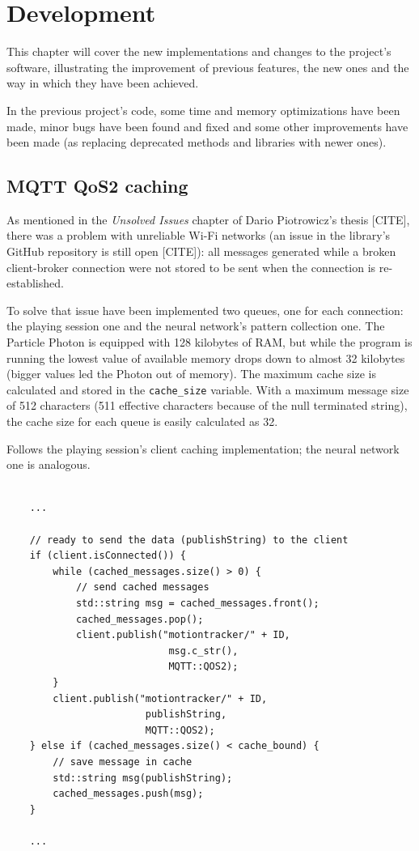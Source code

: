 \chapter{Development}
This chapter will cover the new implementations and changes to the project's software, illustrating the improvement of previous features, the new ones and the way in which they have been achieved.
\bigbreak

In the previous project's code, some time and memory optimizations have been made, minor bugs have been found and fixed and some other improvements have been made (as replacing deprecated methods and libraries with newer ones).

\section{MQTT QoS2 caching}
As mentioned in the \textit{Unsolved Issues} chapter of Dario Piotrowicz's thesis [CITE], there was a problem with unreliable Wi-Fi networks (an issue in the library's GitHub repository is still open [CITE]): all messages generated while a broken client-broker connection were not stored to be sent when the connection is re-established.

To solve that issue have been implemented two queues, one for each connection: the playing session one and the neural network's pattern collection one. The Particle Photon is equipped with 128 kilobytes of RAM, but while the program is running the lowest value of available memory drops down to almost 32 kilobytes (bigger values led the Photon out of memory). The maximum cache size is calculated and stored in the \texttt{cache\_size} variable. With a maximum message size of 512 characters (511 effective characters because of the null terminated string), the cache size for each queue is easily calculated as 32.

Follows the playing session's client caching implementation; the neural network one is analogous.
\bigbreak

\begin{lstlisting}[style=CPPStyle]

	...

	// ready to send the data (publishString) to the client
	if (client.isConnected()) {
        while (cached_messages.size() > 0) {
			// send cached messages
            std::string msg = cached_messages.front();
            cached_messages.pop();
			client.publish("motiontracker/" + ID,
							msg.c_str(),
							MQTT::QOS2);
        }
		client.publish("motiontracker/" + ID,
						publishString,
						MQTT::QOS2);
    } else if (cached_messages.size() < cache_bound) {
		// save message in cache
        std::string msg(publishString);
        cached_messages.push(msg);
    }

	...

\end{lstlisting}
\bigbreak

